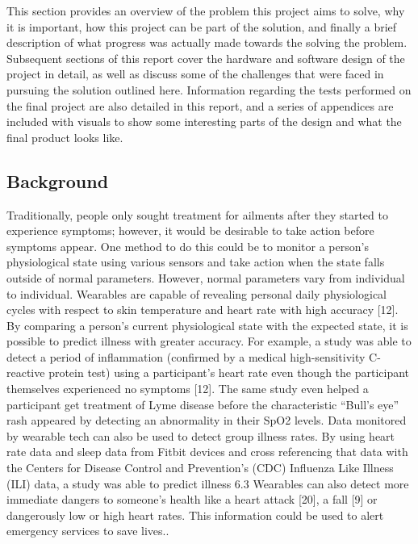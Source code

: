 This section provides an overview of the problem this project aims to solve,
why it is important, how this project can be part of the solution, and finally 
a brief description of what progress was actually made towards the solving the 
problem. Subsequent sections of this report cover the hardware and software design 
of the project in detail, as well as discuss some of the challenges that
were faced in pursuing the solution outlined here. Information regarding the
tests performed on the final project are also detailed in this report, and a
series of appendices are included with visuals to show some interesting parts 
of the design and what the final product looks like.

\subsection{Background}

Traditionally, people only sought treatment for ailments after they started to experience symptoms; however, it would be desirable to take action before symptoms appear. One method to do this could be to monitor a person’s physiological state using various sensors and take action when the state falls outside of normal parameters. However, normal parameters vary from individual to individual. 
Wearables are capable of revealing personal daily physiological cycles with respect to skin temperature and heart rate with high accuracy [12]. By comparing a person’s current physiological state with the expected state, it is possible to predict illness with greater accuracy. For example, a study was able to detect a period of inflammation (confirmed by a medical high-sensitivity C-reactive protein test) using a participant’s heart rate even though the participant themselves experienced no symptoms [12]. The same study even helped a participant get treatment of Lyme disease before the characteristic “Bull’s eye” rash appeared by detecting an abnormality in their SpO2 levels. 
Data monitored by wearable tech can also be used to detect group illness rates. By using heart rate data and sleep data from Fitbit devices and cross referencing that data with the Centers for Disease Control and Prevention’s (CDC) Influenza Like Illness (ILI) data, a study was able to predict illness 6.3%
Wearables can also detect more immediate dangers to someone’s health like a heart attack [20], a fall [9] or dangerously low or high heart rates. This information could be used to alert emergency services to save lives.\cite{Radin2020}.

